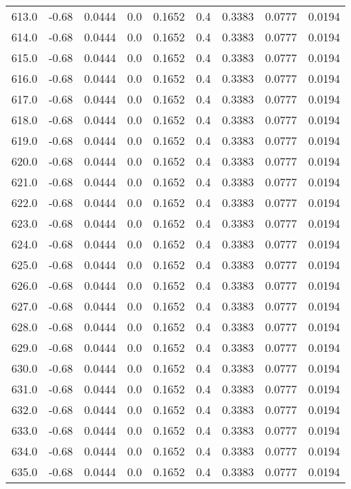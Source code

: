 \begin{longtable}{lrrrrrrrr}
613.0 & -0.68 & 0.0444 & 0.0 & 0.1652 & 0.4 & 0.3383 & 0.0777 & 0.0194 \\
614.0 & -0.68 & 0.0444 & 0.0 & 0.1652 & 0.4 & 0.3383 & 0.0777 & 0.0194 \\
615.0 & -0.68 & 0.0444 & 0.0 & 0.1652 & 0.4 & 0.3383 & 0.0777 & 0.0194 \\
616.0 & -0.68 & 0.0444 & 0.0 & 0.1652 & 0.4 & 0.3383 & 0.0777 & 0.0194 \\
617.0 & -0.68 & 0.0444 & 0.0 & 0.1652 & 0.4 & 0.3383 & 0.0777 & 0.0194 \\
618.0 & -0.68 & 0.0444 & 0.0 & 0.1652 & 0.4 & 0.3383 & 0.0777 & 0.0194 \\
619.0 & -0.68 & 0.0444 & 0.0 & 0.1652 & 0.4 & 0.3383 & 0.0777 & 0.0194 \\
620.0 & -0.68 & 0.0444 & 0.0 & 0.1652 & 0.4 & 0.3383 & 0.0777 & 0.0194 \\
621.0 & -0.68 & 0.0444 & 0.0 & 0.1652 & 0.4 & 0.3383 & 0.0777 & 0.0194 \\
622.0 & -0.68 & 0.0444 & 0.0 & 0.1652 & 0.4 & 0.3383 & 0.0777 & 0.0194 \\
623.0 & -0.68 & 0.0444 & 0.0 & 0.1652 & 0.4 & 0.3383 & 0.0777 & 0.0194 \\
624.0 & -0.68 & 0.0444 & 0.0 & 0.1652 & 0.4 & 0.3383 & 0.0777 & 0.0194 \\
625.0 & -0.68 & 0.0444 & 0.0 & 0.1652 & 0.4 & 0.3383 & 0.0777 & 0.0194 \\
626.0 & -0.68 & 0.0444 & 0.0 & 0.1652 & 0.4 & 0.3383 & 0.0777 & 0.0194 \\
627.0 & -0.68 & 0.0444 & 0.0 & 0.1652 & 0.4 & 0.3383 & 0.0777 & 0.0194 \\
628.0 & -0.68 & 0.0444 & 0.0 & 0.1652 & 0.4 & 0.3383 & 0.0777 & 0.0194 \\
629.0 & -0.68 & 0.0444 & 0.0 & 0.1652 & 0.4 & 0.3383 & 0.0777 & 0.0194 \\
630.0 & -0.68 & 0.0444 & 0.0 & 0.1652 & 0.4 & 0.3383 & 0.0777 & 0.0194 \\
631.0 & -0.68 & 0.0444 & 0.0 & 0.1652 & 0.4 & 0.3383 & 0.0777 & 0.0194 \\
632.0 & -0.68 & 0.0444 & 0.0 & 0.1652 & 0.4 & 0.3383 & 0.0777 & 0.0194 \\
633.0 & -0.68 & 0.0444 & 0.0 & 0.1652 & 0.4 & 0.3383 & 0.0777 & 0.0194 \\
634.0 & -0.68 & 0.0444 & 0.0 & 0.1652 & 0.4 & 0.3383 & 0.0777 & 0.0194 \\
635.0 & -0.68 & 0.0444 & 0.0 & 0.1652 & 0.4 & 0.3383 & 0.0777 & 0.0194 \\

\end{longtable}
